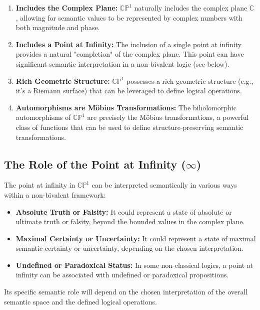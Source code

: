 \documentclass{article}
\begin{document}
	\begin{enumerate}
		\item \textbf{Includes the Complex Plane:} $\mathbb{CP}^1$ naturally includes the complex plane $\mathbb{C}$, allowing for semantic values to be represented by complex numbers with both magnitude and phase.
		
		\item \textbf{Includes a Point at Infinity:} The inclusion of a single point at infinity provides a natural "completion" of the complex plane. This point can have significant semantic interpretation in a non-bivalent logic (see below).
		
		\item \textbf{Rich Geometric Structure:} $\mathbb{CP}^1$ possesses a rich geometric structure (e.g., it's a Riemann surface) that can be leveraged to define logical operations.
		
		\item \textbf{Automorphisms are M\"{o}bius Transformations:} The biholomorphic automorphisms of $\mathbb{CP}^1$ are precisely the M\"{o}bius transformations, a powerful class of functions that can be used to define structure-preserving semantic transformations.
	\end{enumerate}
	
	\subsection{The Role of the Point at Infinity ($\infty$)}
	
	The point at infinity in $\mathbb{CP}^1$ can be interpreted semantically in various ways within a non-bivalent framework:
	
	\begin{itemize}
		\item \textbf{Absolute Truth or Falsity:} It could represent a state of absolute or ultimate truth or falsity, beyond the bounded values in the complex plane.
		
		\item \textbf{Maximal Certainty or Uncertainty:} It could represent a state of maximal semantic certainty or uncertainty, depending on the chosen interpretation.
		
		\item \textbf{Undefined or Paradoxical Status:} In some non-classical logics, a point at infinity can be associated with undefined or paradoxical propositions.
	\end{itemize}
	Its specific semantic role will depend on the chosen interpretation of the overall semantic space and the defined logical operations.
	
\end{document}
